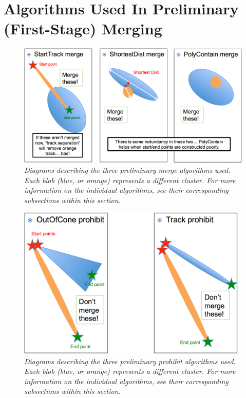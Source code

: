 \documentclass{article}
\begin{document}
\newpage
\section{Algorithms Used In Preliminary (First-Stage) Merging}\label{sec:PrelimMerging}

\begin{figure}[h!]
\begin{center}
\includegraphics[width=150mm]{Figures/prelim_merge_algos.png}
\end{center}
\caption{\textit{Diagrams describing the three preliminary merge algorithms used. Each blob (blue, or orange) represents a different cluster. For more information on the individual algorithms, see their corresponding subsections within this section.}}
\label{prelim_merge_algos_fig}
\end{figure}

\begin{figure}[h!]
\begin{center}
\includegraphics[width=110mm]{Figures/prelim_prohibit_algos.png}
\end{center}
\caption{\textit{Diagrams describing the three preliminary prohibit algorithms used. Each blob (blue, or orange) represents
a different cluster. For more information on the individual algorithms, see their corresponding subsections within this 
section.}}
\label{prelim_prohibit_algos_fig}
\end{figure}
\end{document}
